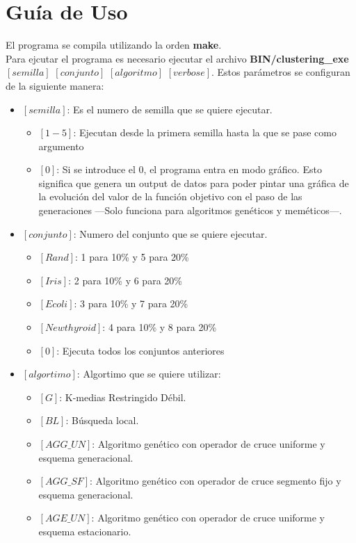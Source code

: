 \newpage
\section{Guía de Uso}
El programa se compila utilizando la orden \textbf{make}.\\
Para ejcutar el programa es necesario ejecutar el archivo \textbf{BIN/clustering\_exe} $[semilla]$ $[conjunto]$ $[algoritmo]$ $[verbose]$.
Estos parámetros se configuran de la siguiente manera:
\begin{itemize}
   \item $[semilla]$: Es el numero de semilla que se quiere ejecutar.
   \begin{itemize}
      \item $[1-5]$: Ejecutan desde la primera semilla hasta la que se pase como argumento
      \item $[0]$: Si se introduce el 0, el programa entra en modo gráfico. Esto significa que genera un output de datos para poder pintar una gráfica de la evolución del valor de la función objetivo con el paso de las generaciones ---Solo funciona para algoritmos genéticos y meméticos---.
   \end{itemize}
   \item $[conjunto]$: Numero del conjunto que se quiere ejecutar.
   \begin{itemize}
      \item $[Rand]$: 1 para 10\% y 5 para 20\%
      \item $[Iris]$: 2 para 10\% y 6 para 20\%
      \item $[Ecoli]$: 3 para 10\% y 7 para 20\%
      \item $[Newthyroid]$: 4 para 10\% y 8 para 20\%
      \item $[0]$: Ejecuta todos los conjuntos anteriores
   \end{itemize}
   \item $[algortimo]$: Algortimo que se quiere utilizar:
   \begin{itemize}
      \item $[G]$: K-medias Restringido Débil.
      \item $[BL]$: Búsqueda local.
      \item $[AGG\_UN]$: Algoritmo genético con operador de cruce uniforme y esquema generacional.
      \item $[AGG\_SF]$: Algoritmo genético con operador de cruce segmento fijo y esquema generacional.
      \item $[AGE\_UN]$: Algoritmo genético con operador de cruce uniforme y esquema estacionario.

\end{itemize}
\end{itemize}
